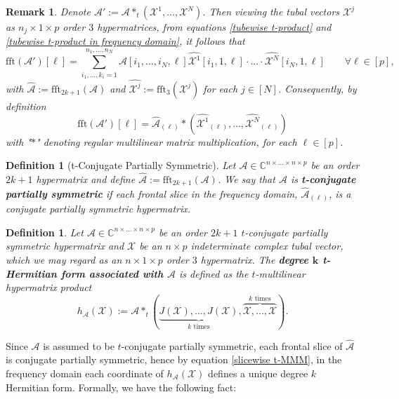 \documentclass[11pt]{article}
\newtheorem{defn}[theorem]{Definition}
\newtheorem{remark}[theorem]{Remark}
\begin{document}
\begin{remark}\label{t-multilinear hypermatrix product in frequency domain}
    Denote $\mathcal{A}' := \mathcal{A}*_t(\mathcal{X}^1,\dots,\mathcal{X}^N)$. Then viewing the tubal vectors $\mathcal{X}^j$ as $n_j\times 1\times p$ order $3$ hypermatrices, from equations \eqref{tubewise t-product} and \eqref{tubewise t-product in frequency domain}, it follows that 
    \[\mathrm{fft}(\mathcal{A}')[\ell] = \sum\limits_{i_1,\dots,k_i=1}^{n_1,\dots,n_N}\widehat{\mathcal{A}}[i_1,\dots,i_N,\ell]\widehat{\mathcal{X}^1}[i_1,1,\ell]\cdot...\cdot\widehat{\mathcal{X}^N}[i_N,1,\ell]\qquad \forall \ell\in [p],\]
    with $\widehat{\mathcal{A}}:=\mathrm{fft}_{2k+1}(\mathcal{A})$ and $\widehat{\mathcal{X}^j}:=\mathrm{fft}_3(\mathcal{X}^j)$ for each $j\in [N]$. Consequently, by definition 
    \begin{equation}\label{slicewise t-MMM}
        \mathrm{fft}(\mathcal{A}')[\ell] = \widehat{\mathcal{A}}_{(\ell)}*\left(\widehat{\mathcal{X}^1}_{(\ell)},...,\widehat{\mathcal{X}^N}_{(\ell)}\right)
    \end{equation}
    with "$*$" denoting regular multilinear matrix multiplication, for each $\ell\in [p]$. 
\end{remark}
\begin{defn}[t-Conjugate Partially Symmetric]
    Let $\mathcal{A}\in \mathbb{C}^{n\times...\times n\times p}$ be an order $2k+1$ hypermatrix and define $\widehat{\mathcal{A}} := \mathrm{fft}_{2k+1}(\mathcal{A})$. We say that $\mathcal{A}$ is \textbf{t-conjugate partially symmetric} if each frontal slice in the frequency domain, $\widehat{\mathcal{A}}_{(\ell)}$, is a conjugate partially symmetric hypermatrix.  
\end{defn}
\begin{defn}
    Let $\mathcal{A}\in \mathbb{C}^{n\times\dots\times n\times p}$ be an order $2k+1$ $t$-conjugate partially symmetric hypermatrix and $\mathcal{X}$ be an $n\times p$ indeterminate complex tubal vector, which we may regard as an $n\times 1\times p$ order $3$ hypermatrix. The \textbf{degree $\boldsymbol{k}$ t-Hermitian form associated with $\boldsymbol{\mathcal{A}}$} is defined as the $t$-multilinear hypermatrix product
    \[h_{\mathcal{A}}(\mathcal{X}) := \mathcal{A}*_t(\underbrace{J(\mathcal{X}),...,J(\mathcal{X})}_{k\text{ times}},\overbrace{\mathcal{X},...,\mathcal{X}}^{k\text{ times}}).\] 
\end{defn}
Since $\mathcal{A}$ is assumed to be $t$-conjugate partially symmetric, each frontal slice of $\widehat{\mathcal{A}}$ is conjugate partially symmetric, hence by equation \eqref{slicewise t-MMM}, in the frequency domain each coordinate of $h_{\mathcal{A}}(\mathcal{X})$ defines a unique degree $k$ Hermitian form. Formally, we have the following fact:
\end{document}

